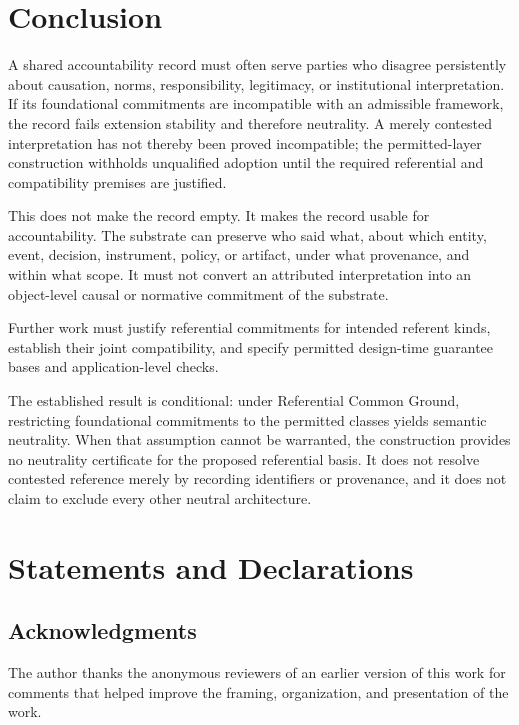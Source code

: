 \documentclass[11pt]{article}
\theoremstyle{plain}
\theoremstyle{definition}
\theoremstyle{remark}
\begin{document}
\section{Conclusion}
\label{sec:conclusion}

A shared accountability record must often serve parties who disagree
persistently about causation, norms, responsibility, legitimacy, or
institutional interpretation.
If its foundational commitments are incompatible with an admissible
framework, the record fails extension stability and therefore neutrality.
A merely contested interpretation has not thereby been proved incompatible;
the permitted-layer construction withholds unqualified adoption until
the required referential and compatibility premises are justified.

This does not make the record empty.
It makes the record usable for accountability.
The substrate can preserve who said what,
about which entity, event, decision, instrument, policy, or artifact,
under what provenance,
and within what scope.
It must not convert an attributed interpretation into
an object-level causal or normative commitment of the substrate.

Further work must justify referential commitments for intended
referent kinds, establish their joint compatibility, and specify
permitted design-time guarantee bases and application-level checks.

The established result is conditional: under Referential Common Ground,
restricting foundational commitments to the permitted classes yields
semantic neutrality. When that assumption cannot be warranted,
the construction provides no neutrality certificate for the proposed
referential basis. It does not resolve contested reference merely
by recording identifiers or provenance, and it does not claim to
exclude every other neutral architecture.

\section*{Statements and Declarations}

\subsection*{Acknowledgments} The author thanks the anonymous reviewers
of an earlier version of this work for comments that helped improve
the framing, organization, and presentation of the work.
\end{document}
